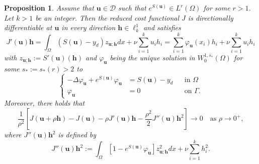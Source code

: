 \documentclass[10pt,a4paper]{amsart}
\newtheorem{proposition}{Proposition}
\begin{document}
\begin{proposition}
	\label{prop:cost-func-1st-2nd-directional-der}
	Assume that $\bm{u} \in \mathcal{D}$ such that $e^{S(\bm{u})} \in L^r(\Omega)$ for some $r > 1$. Let $k > 1$ be an integer.
	Then the reduced cost functional $J$ is directionally differentiable at $\bm{u}$ in every direction $\bm{h} \in \ell^1_k$ and satisfies
	\begin{equation}
		\label{eq:cost-func-1st-directional-der}
		J'(\bm{u})\bm{h} = \int_\Omega (S(\bm{u}) - y_d)z_{\bm{u}; \bm{h}} dx + \nu \sum_{i=1}^k u_i h_i 
		 = \sum_{i=1}^k \varphi_{\bm{u}}(x_i) h_i + \nu \sum_{i=1}^k u_i h_i
	\end{equation}
	with $z_{\bm{u}; \bm{h}} := S'(\bm{u})(\bm{h})$ and $\varphi_{\bm{u}}$ being the unique solution  in $W^{1,s_*}_0(\Omega)$ 
	for some $s_* :=  s_*(r) >2$	to 
	\begin{equation}
		\label{eq:adjoint-state0}
		\left\{
		\begin{aligned}
			-\Delta \varphi_{\bm{u}} + e^{S(\bm{u})} \varphi_{\bm{u}}& = S(\bm{u}) - y_d && \text{in } \Omega \\
			\varphi_{\bm{u}} &= 0 && \text{on } \Gamma.
		\end{aligned}
		\right.
	\end{equation}
	Moreover, there holds that
	\begin{equation}
		\label{eq:cost-func-2nd-directional-der-limit}
		\frac{1}{\rho^2} \left[J(\bm{u} + \rho \bm{h}) - J(\bm{u} ) - \rho J'(\bm{u})\bm{h} - \frac{\rho^2}{2} J''(\bm{u})\bm{h}^2   \right] \to 0 \quad \text{as } \rho \to 0^+,
	\end{equation}
	where $J''(\bm{u})\bm{h}^2$ is defined by
	\begin{equation} 
		\label{eq:cost-func-2nd-directional-der-def}
		J''(\bm{u})\bm{h}^2 %
		  := \int_{\Omega} \left[1 - e^{S(\bm{u})} \varphi_{\bm{u}} \right] z_{\bm{u}; \bm{h}}^2 dx 	 + \nu \sum_{i=1}^k h_i^2.
	\end{equation}
\end{proposition}
\end{document}
